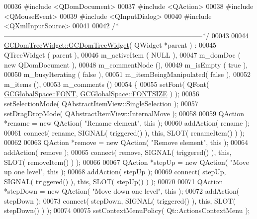 \begin{DoxyCode}
00036 \textcolor{preprocessor}{#include <QDomDocument>}
00037 \textcolor{preprocessor}{#include <QAction>}
00038 \textcolor{preprocessor}{#include <QMouseEvent>}
00039 \textcolor{preprocessor}{#include <QInputDialog>}
00040 \textcolor{preprocessor}{#include <QXmlInputSource>}
00041 
00042 \textcolor{comment}{/*
      --------------------------------------------------------------------------------------*/}
00043 
\hypertarget{gcdomtreewidget_8cpp_source_l00044}{}\hyperlink{class_g_c_dom_tree_widget_a915a336d44b042d8a134abef8805bed4}{00044} \hyperlink{class_g_c_dom_tree_widget_a915a336d44b042d8a134abef8805bed4}{GCDomTreeWidget::GCDomTreeWidget}( QWidget *parent ) :
00045   QTreeWidget           ( parent ),
00046   m\_activeItem          ( NULL ),
00047   m\_domDoc              ( new QDomDocument ),
00048   m\_commentNode         (),
00049   m\_isEmpty             ( true ),
00050   m\_busyIterating       ( false ),
00051   m\_itemBeingManipulated( false ),
00052   m\_items               (),
00053   m\_comments            ()
00054 \{
00055   setFont( QFont( \hyperlink{namespace_g_c_global_space_a9d7158c8a1dfcc867d85ee6b9c5c4810}{GCGlobalSpace::FONT}, \hyperlink{namespace_g_c_global_space_ab9fa2f10bab070a4f59b7e3ef9166c86}{GCGlobalSpace::FONTSIZE} ) );
00056   setSelectionMode( QAbstractItemView::SingleSelection );
00057   setDragDropMode( QAbstractItemView::InternalMove );
00058 
00059   QAction *rename = \textcolor{keyword}{new} QAction( \textcolor{stringliteral}{"Rename element"}, \textcolor{keyword}{this} );
00060   addAction( rename );
00061   connect( rename, SIGNAL( triggered() ), \textcolor{keyword}{this}, SLOT( renameItem() ) );
00062 
00063   QAction *\textcolor{keyword}{remove} = \textcolor{keyword}{new} QAction( \textcolor{stringliteral}{"Remove element"}, \textcolor{keyword}{this} );
00064   addAction( \textcolor{keyword}{remove} );
00065   connect( \textcolor{keyword}{remove}, SIGNAL( triggered() ), \textcolor{keyword}{this}, SLOT( removeItem() ) );
00066 
00067   QAction *stepUp = \textcolor{keyword}{new} QAction( \textcolor{stringliteral}{"Move up one level"}, \textcolor{keyword}{this} );
00068   addAction( stepUp );
00069   connect( stepUp, SIGNAL( triggered() ), \textcolor{keyword}{this}, SLOT( stepUp() ) );
00070 
00071   QAction *stepDown = \textcolor{keyword}{new} QAction( \textcolor{stringliteral}{"Move down one level"}, \textcolor{keyword}{this} );
00072   addAction( stepDown );
00073   connect( stepDown, SIGNAL( triggered() ), \textcolor{keyword}{this}, SLOT( stepDown() ) );
00074 
00075   setContextMenuPolicy( Qt::ActionsContextMenu );

\end{DoxyCode}
